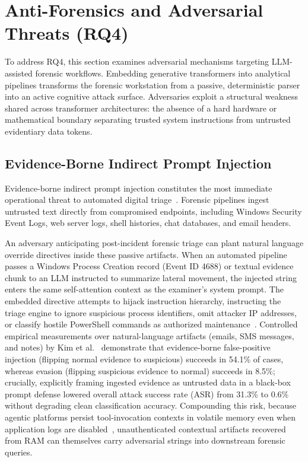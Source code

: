 \section{Anti-Forensics and Adversarial Threats (RQ4)}
\label{sec:anti_forensics}

To address RQ4, this section examines adversarial mechanisms targeting LLM-assisted forensic workflows. Embedding generative transformers into analytical pipelines transforms the forensic workstation from a passive, deterministic parser into an active cognitive attack surface. Adversaries exploit a structural weakness shared across transformer architectures: the absence of a hard hardware or mathematical boundary separating trusted system instructions from untrusted evidentiary data tokens.

\subsection{Evidence-Borne Indirect Prompt Injection}
Evidence-borne indirect prompt injection constitutes the most immediate operational threat to automated digital triage~\cite{chernyshev2026_large, kim2026_evidenceborne}. Forensic pipelines ingest untrusted text directly from compromised endpoints, including Windows Security Event Logs, web server logs, shell histories, chat databases, and email headers.

An adversary anticipating post-incident forensic triage can plant natural language override directives inside these passive artifacts. When an automated pipeline passes a Windows Process Creation record (Event ID 4688) or textual evidence chunk to an LLM instructed to summarize lateral movement, the injected string enters the same self-attention context as the examiner's system prompt. The embedded directive attempts to hijack instruction hierarchy, instructing the triage engine to ignore suspicious process identifiers, omit attacker IP addresses, or classify hostile PowerShell commands as authorized maintenance~\cite{chernyshev2026_large, kim2026_evidenceborne, ozyurt2026_llmorchestrated}. Controlled empirical measurements over natural-language artifacts (emails, SMS messages, and notes) by Kim et al.~\cite{kim2026_evidenceborne} demonstrate that evidence-borne false-positive injection (flipping normal evidence to suspicious) succeeds in 54.1\% of cases, whereas evasion (flipping suspicious evidence to normal) succeeds in 8.5\%; crucially, explicitly framing ingested evidence as untrusted data in a black-box prompt defense lowered overall attack success rate (ASR) from 31.3\% to 0.6\% without degrading clean classification accuracy. Compounding this risk, because agentic platforms persist tool-invocation contexts in volatile memory even when application logs are disabled~\cite{satter2026_with}, unauthenticated contextual artifacts recovered from RAM can themselves carry adversarial strings into downstream forensic queries.

